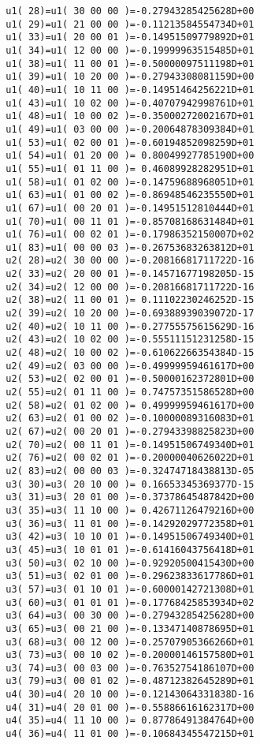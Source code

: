 {\begin{verbatim}
  u1( 28)=u1( 30 00 00 )=-0.27943285425628D+00
  u1( 29)=u1( 21 00 00 )=-0.11213584554734D+01
  u1( 33)=u1( 20 00 01 )=-0.14951509779892D+01
  u1( 34)=u1( 12 00 00 )=-0.19999963515485D+01
  u1( 38)=u1( 11 00 01 )=-0.50000097511198D+01
  u1( 39)=u1( 10 20 00 )=-0.27943308081159D+00
  u1( 40)=u1( 10 11 00 )=-0.14951464256221D+01
  u1( 43)=u1( 10 02 00 )=-0.40707942998761D+01
  u1( 48)=u1( 10 00 02 )=-0.35000272002167D+01
  u1( 49)=u1( 03 00 00 )=-0.20064878309384D+01
  u1( 53)=u1( 02 00 01 )=-0.60194852098259D+01
  u1( 54)=u1( 01 20 00 )= 0.80049927785190D+00
  u1( 55)=u1( 01 11 00 )= 0.46089928282951D+01
  u1( 58)=u1( 01 02 00 )=-0.14759688968051D+01
  u1( 63)=u1( 01 00 02 )=-0.86948546235550D+01
  u1( 67)=u1( 00 20 01 )=-0.14951512810444D+01
  u1( 70)=u1( 00 11 01 )=-0.85708168631484D+01
  u1( 76)=u1( 00 02 01 )=-0.17986352150007D+02
  u1( 83)=u1( 00 00 03 )=-0.26753683263812D+01
  u2( 28)=u2( 30 00 00 )=-0.20816681711722D-16
  u2( 33)=u2( 20 00 01 )=-0.14571677198205D-15
  u2( 34)=u2( 12 00 00 )=-0.20816681711722D-16
  u2( 38)=u2( 11 00 01 )= 0.11102230246252D-15
  u2( 39)=u2( 10 20 00 )=-0.69388939039072D-17
  u2( 40)=u2( 10 11 00 )=-0.27755575615629D-16
  u2( 43)=u2( 10 02 00 )=-0.55511151231258D-15
  u2( 48)=u2( 10 00 02 )=-0.61062266354384D-15
  u2( 49)=u2( 03 00 00 )=-0.49999959461617D+00
  u2( 53)=u2( 02 00 01 )=-0.50000162372801D+00
  u2( 55)=u2( 01 11 00 )= 0.74757351586528D+00
  u2( 58)=u2( 01 02 00 )= 0.49999959461617D+00
  u2( 63)=u2( 01 00 02 )=-0.10000089316083D+01
  u2( 67)=u2( 00 20 01 )=-0.27943398825823D+00
  u2( 70)=u2( 00 11 01 )=-0.14951506749340D+01
  u2( 76)=u2( 00 02 01 )=-0.20000040626022D+01
  u2( 83)=u2( 00 00 03 )=-0.32474718438813D-05
  u3( 30)=u3( 20 10 00 )= 0.16653345369377D-15
  u3( 31)=u3( 20 01 00 )=-0.37378645487842D+00
  u3( 35)=u3( 11 10 00 )= 0.42671126479216D+00
  u3( 36)=u3( 11 01 00 )=-0.14292029772358D+01
  u3( 42)=u3( 10 10 01 )=-0.14951506749340D+01
  u3( 45)=u3( 10 01 01 )=-0.61416043756418D+01
  u3( 50)=u3( 02 10 00 )=-0.92920500415430D+00
  u3( 51)=u3( 02 01 00 )=-0.29623833617786D+01
  u3( 57)=u3( 01 10 01 )=-0.60000142721308D+01
  u3( 60)=u3( 01 01 01 )=-0.17768425853934D+02
  u3( 64)=u3( 00 30 00 )=-0.27943285425628D+00
  u3( 65)=u3( 00 21 00 )=-0.13347140878695D+01
  u3( 68)=u3( 00 12 00 )=-0.25707905366266D+01
  u3( 73)=u3( 00 10 02 )=-0.20000146157580D+01
  u3( 74)=u3( 00 03 00 )=-0.76352754186107D+00
  u3( 79)=u3( 00 01 02 )=-0.48712382645289D+01
  u4( 30)=u4( 20 10 00 )=-0.12143064331838D-16
  u4( 31)=u4( 20 01 00 )=-0.55886616162317D+00
  u4( 35)=u4( 11 10 00 )= 0.87786491384764D+00
  u4( 36)=u4( 11 01 00 )=-0.10684345547215D+01

\end{verbatim}}
